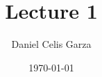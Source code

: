 \documentclass[10pt,a4paper]{article}
\begin{document}
	\title{Lecture 1}
	\author{Daniel Celis Garza}
	\date{\today}
	\maketitle
	\inputminted{python}{../python/test.py}
\end{document}
